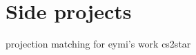 \chapter{Side projects}

\begin{outline}
\1 projection matching for eymi's work
\1 cs2star
\1 
\end{outline}
